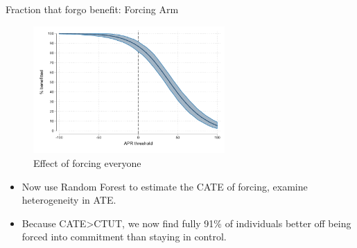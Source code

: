 \documentclass[8pt]{beamer}
\begin{document}
\begin{frame}{Fraction that forgo benefit:  Forcing Arm}


   
    
        \begin{figure}
         \label{better_forceall}
        \caption{Effect of forcing everyone}
        \centering
        \includegraphics[width=0.65\textwidth]{Figuras/line_better_forceall_apr_te_cf.pdf}
        \end{figure}

\begin{itemize}
    \item   Now use Random Forest to estimate the CATE of forcing, examine heterogeneity in ATE.
    \item   Because CATE>CTUT, we now find fully 91\% of individuals better off being forced into commitment than staying in control.
\end{itemize}        


\end{frame}
\end{document}
